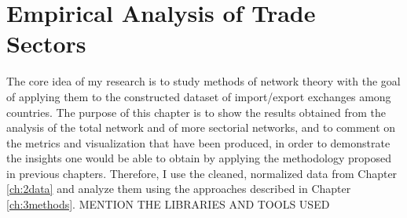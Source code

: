 \chapter{Empirical Analysis of Trade Sectors}\label{ch:4scenarios}




The core idea of my research is to study methods of network theory with the goal of applying them to the constructed dataset of import/export exchanges among countries. The purpose of this chapter is to show the results obtained from the analysis of the total network and of more sectorial networks, and to comment on the metrics and visualization that have been produced, in order to demonstrate the insights one would be able to obtain by applying the methodology proposed in previous chapters. Therefore, I use the cleaned, normalized data from Chapter \ref{ch:2data} and analyze them using the approaches described in Chapter \ref{ch:3methods}.
MENTION THE LIBRARIES AND TOOLS USED

